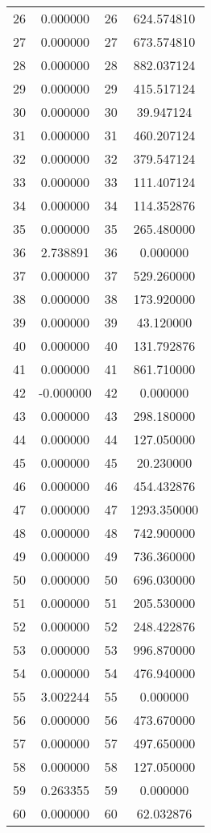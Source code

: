\documentclass[12pt]{article}
\begin{document}
\begin{longtable}{@{}cccc@{}}
26 & 0.000000 & 26 & 624.574810 \\
27 & 0.000000 & 27 & 673.574810 \\
28 & 0.000000 & 28 & 882.037124 \\
29 & 0.000000 & 29 & 415.517124 \\
30 & 0.000000 & 30 & 39.947124 \\
31 & 0.000000 & 31 & 460.207124 \\
32 & 0.000000 & 32 & 379.547124 \\
33 & 0.000000 & 33 & 111.407124 \\
34 & 0.000000 & 34 & 114.352876 \\
35 & 0.000000 & 35 & 265.480000 \\
36 & 2.738891 & 36 & 0.000000 \\
37 & 0.000000 & 37 & 529.260000 \\
38 & 0.000000 & 38 & 173.920000 \\
39 & 0.000000 & 39 & 43.120000 \\
40 & 0.000000 & 40 & 131.792876 \\
41 & 0.000000 & 41 & 861.710000 \\
42 & -0.000000 & 42 & 0.000000 \\
43 & 0.000000 & 43 & 298.180000 \\
44 & 0.000000 & 44 & 127.050000 \\
45 & 0.000000 & 45 & 20.230000 \\
46 & 0.000000 & 46 & 454.432876 \\
47 & 0.000000 & 47 & 1293.350000 \\
48 & 0.000000 & 48 & 742.900000 \\
49 & 0.000000 & 49 & 736.360000 \\
50 & 0.000000 & 50 & 696.030000 \\
51 & 0.000000 & 51 & 205.530000 \\
52 & 0.000000 & 52 & 248.422876 \\
53 & 0.000000 & 53 & 996.870000 \\
54 & 0.000000 & 54 & 476.940000 \\
55 & 3.002244 & 55 & 0.000000 \\
56 & 0.000000 & 56 & 473.670000 \\
57 & 0.000000 & 57 & 497.650000 \\
58 & 0.000000 & 58 & 127.050000 \\
59 & 0.263355 & 59 & 0.000000 \\
60 & 0.000000 & 60 & 62.032876 \\

\end{longtable}
\end{document}
